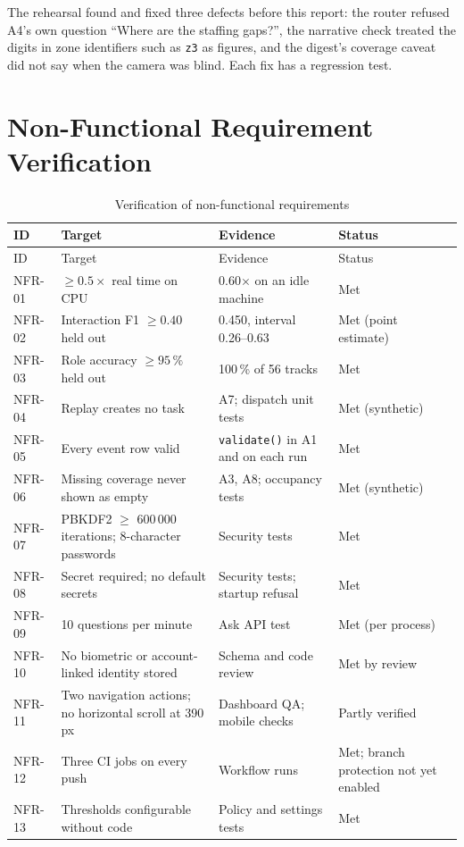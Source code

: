 The rehearsal found and fixed three defects before this report: the router refused A4's own question ``Where are the staffing gaps?'', the narrative check treated the digits in zone identifiers such as \texttt{z3} as figures, and the digest's coverage caveat did not say when the camera was blind. Each fix has a regression test.

\section{Non-Functional Requirement Verification}
\begin{longtable}{P{0.1\textwidth}P{0.34\textwidth}P{0.29\textwidth}P{0.17\textwidth}}
\caption{Verification of non-functional requirements}\label{tab:nfr-verify}\\
\toprule
ID & Target & Evidence & Status\\
\midrule
\endfirsthead
\toprule
ID & Target & Evidence & Status\\
\midrule
\endhead
\bottomrule
\endfoot
NFR-01 & $\geq 0.5\times$ real time on CPU & 0.60$\times$ on an idle machine & Met\\
NFR-02 & Interaction F1 $\geq 0.40$ held out & 0.450, interval 0.26--0.63 & Met (point estimate)\\
NFR-03 & Role accuracy $\geq 95\,\%$ held out & 100\,\% of 56 tracks & Met\\
NFR-04 & Replay creates no task & A7; dispatch unit tests & Met (synthetic)\\
NFR-05 & Every event row valid & \texttt{validate()} in A1 and on each run & Met\\
NFR-06 & Missing coverage never shown as empty & A3, A8; occupancy tests & Met (synthetic)\\
NFR-07 & PBKDF2 $\geq$ 600\,000 iterations; 8-character passwords & Security tests & Met\\
NFR-08 & Secret required; no default secrets & Security tests; startup refusal & Met\\
NFR-09 & 10 questions per minute & Ask API test & Met (per process)\\
NFR-10 & No biometric or account-linked identity stored & Schema and code review & Met by review\\
NFR-11 & Two navigation actions; no horizontal scroll at 390\,px & Dashboard QA; mobile checks & Partly verified\\
NFR-12 & Three CI jobs on every push & Workflow runs & Met; branch protection not yet enabled\\
NFR-13 & Thresholds configurable without code & Policy and settings tests & Met\\
\end{longtable}

